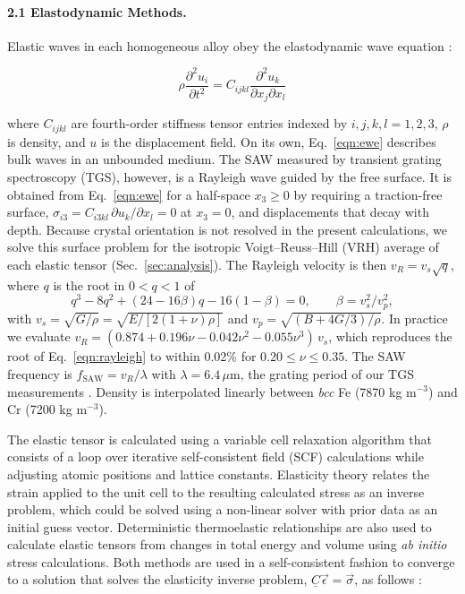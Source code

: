 \documentclass[final,3p,times]{elsarticle}
\begin{document}
\paragraph{2.1 Elastodynamic Methods.}

Elastic waves in each homogeneous alloy obey the elastodynamic wave equation \cite{du2017facile}:

\begin{equation*}
    \rho \frac{\partial^2 u_i}{\partial t^2} = C_{ijkl} \frac{\partial^2 u_k}{\partial x_j \partial x_l}
\end{equation*}

where $C_{ijkl}$ are fourth-order stiffness tensor entries indexed by $i,j,k,l=1,2,3$, $\rho$ is density, and $u$ is the displacement field. On its own, Eq.~\ref{eqn:ewe} describes bulk waves in an unbounded medium. The SAW measured by transient grating spectroscopy (TGS), however, is a Rayleigh wave guided by the free surface. It is obtained from Eq.~\ref{eqn:ewe} for a half-space $x_3 \geq 0$ by requiring a traction-free surface, $\sigma_{i3} = C_{i3kl}\,\partial u_k/\partial x_l = 0$ at $x_3=0$, and displacements that decay with depth. Because crystal orientation is not resolved in the present calculations, we solve this surface problem for the isotropic Voigt--Reuss--Hill (VRH) average of each elastic tensor (Sec.~\ref{sec:analysis}). The Rayleigh velocity is then $v_R = v_s\sqrt{q}$, where $q$ is the root in $0<q<1$ of
\begin{equation*}
q^3 - 8q^2 + (24-16\beta)q - 16(1-\beta) = 0, \qquad \beta = v_s^2/v_p^2,
\end{equation*}
with $v_s=\sqrt{G/\rho}=\sqrt{E/[2(1+\nu)\rho]}$ and $v_p=\sqrt{(B+4G/3)/\rho}$. In practice we evaluate $v_R=(0.874+0.196\nu-0.042\nu^2-0.055\nu^3)\,v_s$, which reproduces the root of Eq.~\ref{eqn:rayleigh} to within 0.02\% for $0.20\leq\nu\leq0.35$. The SAW frequency is $f_{\mathrm{SAW}} = v_R/\lambda$ with $\lambda = 6.4\,\mu$m, the grating period of our TGS measurements \cite{al2023detecting}. Density is interpolated linearly between \textit{bcc} Fe (7870 kg m$^{-3}$) and Cr (7200 kg m$^{-3}$).

The elastic tensor is calculated using a variable cell relaxation algorithm that consists of a loop over iterative self-consistent field (SCF) calculations while adjusting atomic positions and lattice constants. Elasticity theory relates the strain applied to the unit cell to the resulting calculated stress as an inverse problem, which could be solved using a non-linear solver with prior data as an initial guess vector. Deterministic thermoelastic relationships are also used to calculate elastic tensors from changes in total energy and volume using \textit{ab initio} stress calculations. Both methods are used in a self-consistent fashion to converge to a solution that solves the elasticity inverse problem, $\underline{C}\vec{\epsilon} = \vec{\sigma}$, as follows \cite{timoshenko1951theory, mit1620}:
\end{document}

